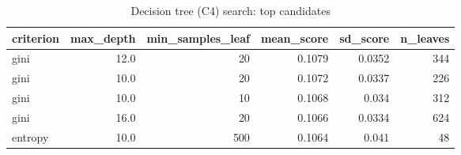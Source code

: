 \begin{table}[htbp]
\centering
\small
\caption{Decision tree (C4) search: top candidates}
\begin{tabular}{lrrrrr}
\toprule
criterion & max\_depth & min\_samples\_leaf & mean\_score & sd\_score & n\_leaves \\
\midrule
gini & 12.0 & 20 & 0.1079 & 0.0352 & 344 \\
gini & 10.0 & 20 & 0.1072 & 0.0337 & 226 \\
gini & 10.0 & 10 & 0.1068 & 0.034 & 312 \\
gini & 16.0 & 20 & 0.1066 & 0.0334 & 624 \\
entropy & 10.0 & 500 & 0.1064 & 0.041 & 48 \\
\bottomrule
\end{tabular}
\par\smallskip\begin{minipage}{\linewidth}\footnotesize \end{minipage}
\end{table}

